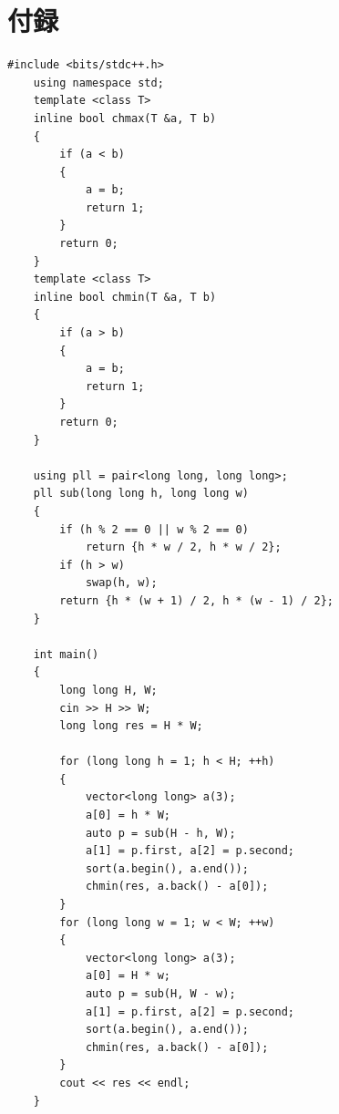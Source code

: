 \documentclass[12pt]{jarticle}
\begin{document}
\section{付録}
\begin{lstlisting}[style = lstcpp,caption=saiteki.cpp]
    #include <bits/stdc++.h>
    using namespace std;
    template <class T>
    inline bool chmax(T &a, T b)
    {
        if (a < b)
        {
            a = b;
            return 1;
        }
        return 0;
    }
    template <class T>
    inline bool chmin(T &a, T b)
    {
        if (a > b)
        {
            a = b;
            return 1;
        }
        return 0;
    }
    
    using pll = pair<long long, long long>;
    pll sub(long long h, long long w)
    {
        if (h % 2 == 0 || w % 2 == 0)
            return {h * w / 2, h * w / 2};
        if (h > w)
            swap(h, w);
        return {h * (w + 1) / 2, h * (w - 1) / 2};
    }
    
    int main()
    {
        long long H, W;
        cin >> H >> W;
        long long res = H * W;
    
        for (long long h = 1; h < H; ++h)
        {
            vector<long long> a(3);
            a[0] = h * W;
            auto p = sub(H - h, W);
            a[1] = p.first, a[2] = p.second;
            sort(a.begin(), a.end());
            chmin(res, a.back() - a[0]);
        }
        for (long long w = 1; w < W; ++w)
        {
            vector<long long> a(3);
            a[0] = H * w;
            auto p = sub(H, W - w);
            a[1] = p.first, a[2] = p.second;
            sort(a.begin(), a.end());
            chmin(res, a.back() - a[0]);
        }
        cout << res << endl;
    }
\end{lstlisting}


\end{document}
